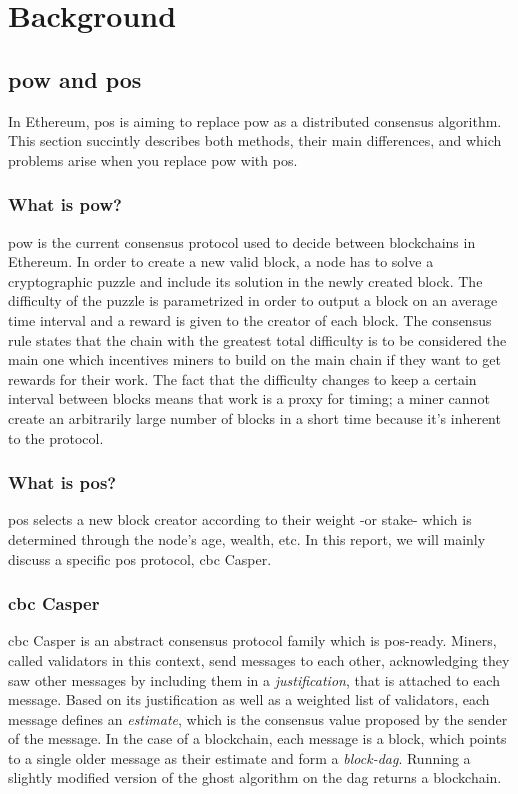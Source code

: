 \chapter{Background}
\label{chap:background}

\section{\gls{pow} and \gls{pos}}
In Ethereum, \gls{pos} is aiming to replace \gls{pow} as a distributed consensus
algorithm. This section succintly describes both methods, their main
differences, and which problems arise when you replace \gls{pow} with \gls{pos}.

\subsection{What is \gls{pow}?}
\gls{pow} is the current consensus protocol used to decide between blockchains
in Ethereum. In order to create a new valid block, a node has to solve a
cryptographic puzzle and include its solution in the newly created block. The
difficulty of the puzzle is parametrized in order to output a block on an
average time interval and a reward is given to the creator of each block.  The
consensus rule states that the chain with the greatest total difficulty is to be
considered the main one which incentives miners to build on the main chain if
they want to get rewards for their work. The fact that the difficulty changes to
keep a certain interval between blocks means that work is a proxy for timing; a
miner cannot create an arbitrarily large number of blocks in a short time
because it's inherent to the protocol.


\subsection{What is \gls{pos}?}
\gls{pos} selects a new block creator according to their weight -or stake- which
is determined through the node's age, wealth, etc. In this report, we will
mainly discuss a specific \gls{pos} protocol, \gls{cbc} Casper.

\subsection{\gls{cbc} Casper}
\label{ssec:cbc}
\FloatBarrier
\gls{cbc} Casper \cite{abstractCBC} \cite{abstractCBC2} is an abstract consensus
protocol family which is \gls{pos}-ready. Miners, called validators in this
context, send messages to each other, acknowledging they saw other messages by
including them in a \textit{justification}, that is attached to each message.
Based on its justification as well as a weighted list of validators, each
message defines an \textit{estimate}, which is the consensus value proposed by
the sender of the message. In the case of a blockchain, each message is a block, which points to a
single older message as their estimate and form a \textit{block-\gls{dag}}. Running
a slightly modified version of the \gls{ghost} algorithm on the \gls{dag}
\cite{abstractCBC} \cite{GHOST} returns a blockchain.

